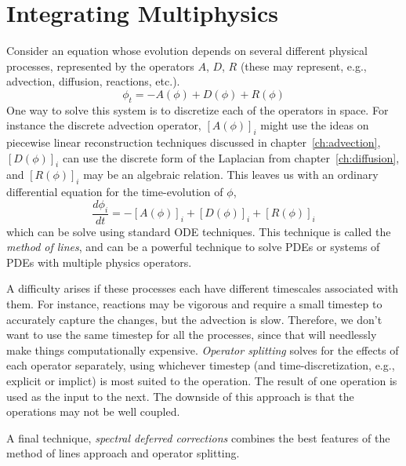 
\begin{quote}
\end{quote}

\section{Integrating Multiphysics}

Consider an equation whose evolution depends on several different
physical processes, represented by the operators $A$, $D$,
$R$ (these may represent, e.g., advection, diffusion, reactions,
etc.).  
\begin{equation}
\phi_t = -A(\phi) + D(\phi) + R(\phi)
\end{equation}
One way to solve this system is to discretize each of the operators in
space.  For instance the discrete advection operator, $[A(\phi)]_i$
might use the ideas on piecewise linear reconstruction techniques
discussed in chapter~\ref{ch:advection}, $[D(\phi)]_i$ can use the
discrete form of the Laplacian from chapter~\ref{ch:diffusion}, and
$[R(\phi)]_i$ may be an algebraic relation.  This leaves us with an ordinary differential equation for the time-evolution of $\phi$,
\begin{equation}
\frac{d\phi_i}{dt} = -[A(\phi)]_i + [D(\phi)]_i + [R(\phi)]_i
\end{equation}
which can be solve using standard ODE techniques.  This technique
is called the {\em method of lines}, and can be a powerful technique
to solve PDEs or systems of PDEs with multiple physics operators.

A difficulty arises if these processes each have different timescales
associated with them.  For instance, reactions may be vigorous and
require a small timestep to accurately capture the changes, but
the advection is slow.  Therefore, we don't want to use the same 
timestep for all the processes, since that will needlessly make things
computationally expensive.  {\em Operator splitting} solves for the
effects of each operator separately, using whichever timestep (and
time-discretization, e.g., explicit or implict) is most suited to the
operation.  The result of one operation is used as the input to the
next.  The downside of this approach is that the operations may
not be well coupled.

A final technique, {\em spectral deferred corrections} combines the 
best features of the method of lines approach and operator splitting.


